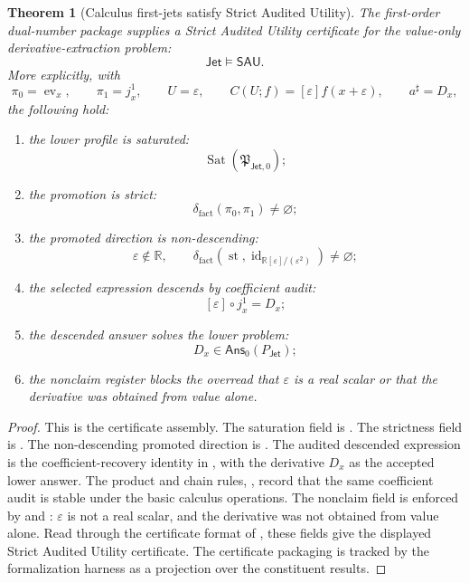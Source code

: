 \documentclass[11pt]{article}
\newcommand{\R}{\mathbb R}
\newcommand{\Dual}{\R[\varepsilon]/(\varepsilon^2)}
\newcommand{\Jet}{\mathsf{Jet}}
\newcommand{\id}{\operatorname{id}}
\newcommand{\ev}{\operatorname{ev}}
\newcommand{\st}{\operatorname{st}}
\newtheorem{theorem}{Theorem}[section]
\theoremstyle{definition}
\begin{document}
\begin{theorem}[Calculus first-jets satisfy Strict Audited Utility]
\label{thm:jet-sau-certificate}
The first-order dual-number package supplies a Strict Audited Utility certificate for the value-only derivative-extraction problem:
\[
\mathsf{Jet}\models\mathsf{SAU}.
\]
More explicitly, with
\[
\pi_0=\ev_x,
\qquad
\pi_1=j_x^1,
\qquad
U=\varepsilon,
\qquad
C(U;f)=[\varepsilon]f(x+\varepsilon),
\qquad
 a^\sharp=D_x,
\]
the following hold:
\begin{enumerate}
\item the lower profile is saturated:
\[
\operatorname{Sat}(\mathfrak P_{\Jet,0});
\]
\item the promotion is strict:
\[
\delta_{\mathrm{fact}}(\pi_0,\pi_1)\neq\varnothing;
\]
\item the promoted direction is non-descending:
\[
\varepsilon\notin\mathbb R,
\qquad
\delta_{\mathrm{fact}}(\st,\id_{\Dual})\neq\varnothing;
\]
\item the selected expression descends by coefficient audit:
\[
[\varepsilon]\circ j_x^1=D_x;
\]
\item the descended answer solves the lower problem:
\[
D_x\in\mathsf{Ans}_0(P_{\Jet});
\]
\item the nonclaim register blocks the overread that \(\varepsilon\) is a real scalar or that the derivative was obtained from value alone.
\end{enumerate}
\end{theorem}

\begin{proof}
This is the certificate assembly.  The saturation field is
.  The strictness field is
.  The non-descending promoted direction is
.  The audited descended expression is the
coefficient-recovery identity in ,
with the derivative \(D_x\) as the accepted lower answer.  The product and chain
rules, , record that the same
coefficient audit is stable under the basic calculus operations.  The nonclaim
field is enforced by  and
: \(\varepsilon\) is not a real scalar,
and the derivative was not obtained from value alone.  Read through the
certificate format of , these fields give the displayed
Strict Audited Utility certificate.  The certificate packaging is tracked by
the formalization harness as a projection over the constituent results.
\end{proof}
\end{document}
